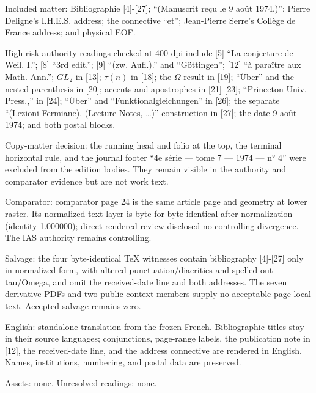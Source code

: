 \documentclass[10pt,oneside]{article}
\begin{document}
Included matter: Bibliographie [4]-[27]; “(Manuscrit reçu le 9 août 1974.)”; Pierre Deligne's I.H.E.S. address; the connective “et”; Jean-Pierre Serre's Collège de France address; and physical EOF.\par

High-risk authority readings checked at 400 dpi include [5] “La conjecture de Weil. I.”; [8] “3rd edit.”; [9] “(zw. Aufl.).” and “Göttingen”; [12] “à paraître aux Math. Ann.”; \(GL_2\) in [13]; \(\tau(n)\) in [18]; the \(\Omega\)-result in [19]; “Über” and the nested parenthesis in [20]; accents and apostrophes in [21]-[23]; “Princeton Univ. Press.,” in [24]; “Über” and “Funktionalgleichungen” in [26]; the separate “(Lezioni Fermiane). (Lecture Notes, …)” construction in [27]; the date 9 août 1974; and both postal blocks.\par

Copy-matter decision: the running head and folio at the top, the terminal horizontal rule, and the journal footer “4e série — tome 7 — 1974 — n° 4” were excluded from the edition bodies. They remain visible in the authority and comparator evidence but are not work text.\par

Comparator: comparator page 24 is the same article page and geometry at lower raster. Its normalized text layer is byte-for-byte identical after normalization (identity 1.000000); direct rendered review disclosed no controlling divergence. The IAS authority remains controlling.\par

Salvage: the four byte-identical TeX witnesses contain bibliography [4]-[27] only in normalized form, with altered punctuation/diacritics and spelled-out tau/Omega, and omit the received-date line and both addresses. The seven derivative PDFs and two public-context members supply no acceptable page-local text. Accepted salvage remains zero.\par

English: standalone translation from the frozen French. Bibliographic titles stay in their source languages; conjunctions, page-range labels, the publication note in [12], the received-date line, and the address connective are rendered in English. Names, institutions, numbering, and postal data are preserved.\par

Assets: none. Unresolved readings: none.\par
\end{document}
